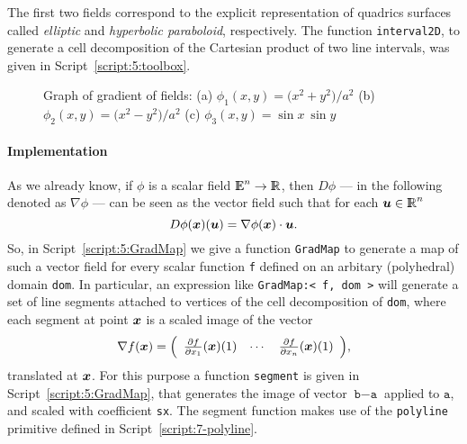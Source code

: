 \documentclass{31x47jw}
\begin{document}
\begin{example}
The first two fields correspond to the explicit representation of
quadrics surfaces called \emph{elliptic} and \emph{hyperbolic
paraboloid}, respectively.  The function \texttt{interval2D}, to generate a
cell decomposition of the Cartesian product of two line intervals, was
given in Script~\ref{script:5:toolbox}.

\begin{figure}[htb]
\centering
\centering{}
\centering{}
\centering{}
\caption{Graph of gradient of fields: (a) $\phi_{1}(x,y)={({x^{2} + y^{2})}/ 
a^{2}} $ (b)~$\phi_{2}(x,y)={({x^{2} - y^{2})}/ a^{2}} $  
(c) $\phi_{3}(x,y)={\sin x \ \sin y}$
\label{figure:5:ex14}}
\end{figure}

\end{example}

\paragraph{Implementation}

As we already know, if $\phi$ is a scalar field
$\mathbb{I\!\!E}^{n}\rightarrow\mathbb{I\!\!R}$, then $D\phi$ --- in the following denoted as
$\nabla \phi$ --- can be seen as the vector field such that for each 
${\mbox{\boldmath $u$}}\in\mathbb{I\!\!R}^{n}$
\[
D\phi({\mbox{\boldmath $x$}})({\mbox{\boldmath $u$}}) = \nabla \phi({\mbox{\boldmath $x$}}) \cdot {\mbox{\boldmath $u$}}.
\]
So, in Script~\ref{script:5:GradMap} we give a function
\texttt{GradMap} to generate a map of such a vector field for every
scalar function \texttt{f} defined on an arbitary (polyhedral) domain
\texttt{dom}.  In particular, an expression like
\texttt{GradMap:< f, dom >} will generate a set of line segments attached
to vertices of the cell decomposition of \texttt{dom}, where each
segment at point ${\mbox{\boldmath $x$}}$ is a scaled image of the vector
\[
\nabla f({\mbox{\boldmath $x$}}) = {\left(\begin{array}{cccccccc} {{\partial f}\over{\partial x_{1}}}({\mbox{\boldmath $x$}})(1) &
\cdots & {{\partial f}\over{\partial x_{n}}}({\mbox{\boldmath $x$}})(1) \end{array}\right)},
\]
translated at ${\mbox{\boldmath $x$}}$.  For this purpose a function \texttt{segment}
is given in Script~\ref{script:5:GradMap}, that generates the image of
vector $\texttt{b}-\texttt{a}$ applied to $\texttt{a}$, and scaled
with coefficient \texttt{sx}.  The segment function makes use of the
\texttt{polyline} primitive defined in Script~\ref{script:7-polyline}.
\end{document}
